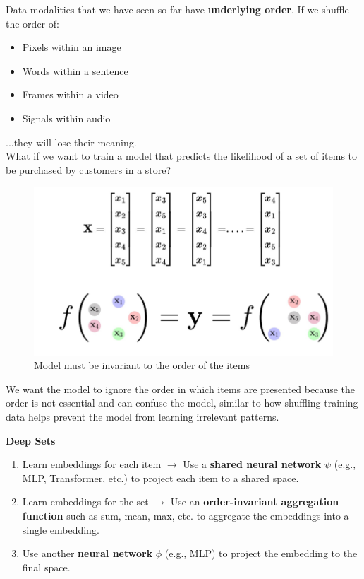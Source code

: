 Data modalities that we have seen so far have\textbf{ underlying order}. If we shuffle the order of:
\begin{itemize}
    \item Pixels within an image
    \item Words within a sentence
    \item Frames within a video
    \item Signals within audio
\end{itemize}
...they will lose their meaning.\\

What if we want to train a model that predicts the likelihood of a set of items to be purchased by customers in a store?

\begin{figure}[h!t]
    \centering
    \includegraphics[width=0.5\linewidth]{datainvariance.png}
    \caption{Model must be invariant to the order of the items}
    \label{fig:enter-label}
\end{figure}

\begin{idea}
We want the model to ignore the order in which items are presented because the order is not essential and can confuse the model, similar to how shuffling training data helps prevent the model from learning irrelevant patterns.
\end{idea}
    
\noindent
\textbf{Deep Sets}\\
\begin{enumerate}
    \item Learn embeddings for each item $\rightarrow$ Use a \textbf{shared neural network} $\psi$ (e.g., MLP, Transformer, etc.) to project each item to a shared space.
    \item Learn embeddings for the set $\rightarrow$ Use an \textbf{order-invariant aggregation function} such as sum, mean, max, etc. to aggregate the embeddings into a single embedding.
    \item Use another \textbf{neural network} $\phi$ (e.g., MLP) to project the embedding to the final space.
\end{enumerate}


